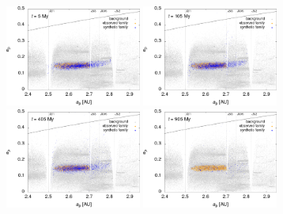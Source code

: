 \documentclass{beamer}
\newlength{\vyska}
\newlength{\vyskaB}
\newlength{\main}
\begin{document}
\begin{frame}
\begin{columns}[t]
\begin{column}{\main}
\begin{tcolorbox}[title=Výsledky\phantom{Úy},height=\vyskaB]
	\vspace{-1.5cm}
	\begin{figure}[t]
		\centering
		\begin{subfigure}[t]{0.33\textwidth}
			\includegraphics[width=0.49\textwidth]{../obr/ae_5t_trans.png}
			\includegraphics[width=0.49\textwidth]{../obr/ae_105t_trans.png}\\
			\includegraphics[width=0.49\textwidth]{../obr/ae_405t_trans.png}
			\includegraphics[width=0.49\textwidth]{../obr/ae_905t_trans.png}
		\end{subfigure}
		\begin{subfigure}[t]{0.33\textwidth}

\end{subfigure}
\end{figure}
\end{tcolorbox}
\end{column}
\end{columns}
\end{frame}
\end{document}
